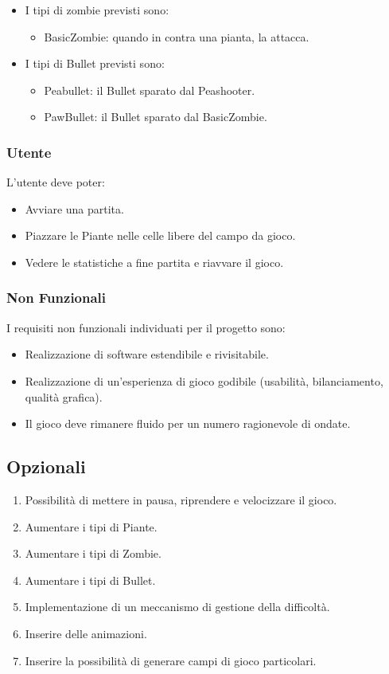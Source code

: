 \begin{itemize}
    \item I tipi di zombie previsti sono:
    \begin{itemize}
        \item BasicZombie: quando in contra una pianta, la attacca.
    \end{itemize}
    \item I tipi di Bullet previsti sono:
    \begin{itemize}
        \item Peabullet: il Bullet sparato dal Peashooter.
        \item PawBullet: il Bullet sparato dal BasicZombie.
    \end{itemize}
\end{itemize}

\subsubsection{Utente}
L'utente deve poter:
\begin{itemize}
    \item Avviare una partita.
    \item Piazzare le Piante nelle celle libere del campo da gioco.
    \item Vedere le statistiche a fine partita e riavvare il gioco.
\end{itemize}

\subsubsection{Non Funzionali}
I requisiti non funzionali individuati per il progetto sono:
\begin{itemize}
    \item Realizzazione di software estendibile e rivisitabile.
    \item Realizzazione di un'esperienza di gioco godibile (usabilità, bilanciamento, qualità grafica).
    \item Il gioco deve rimanere fluido per un numero ragionevole di ondate.
\end{itemize}

\subsection{Opzionali}
\begin{enumerate}
    \item Possibilità di mettere in pausa, riprendere e velocizzare il gioco.
    \item Aumentare i tipi di Piante.
    \item Aumentare i tipi di Zombie.
    \item Aumentare i tipi di Bullet.
    \item Implementazione di un meccanismo di gestione della difficoltà.
    \item Inserire delle animazioni.
    \item Inserire la possibilità di generare campi di gioco particolari.
\end{enumerate}


